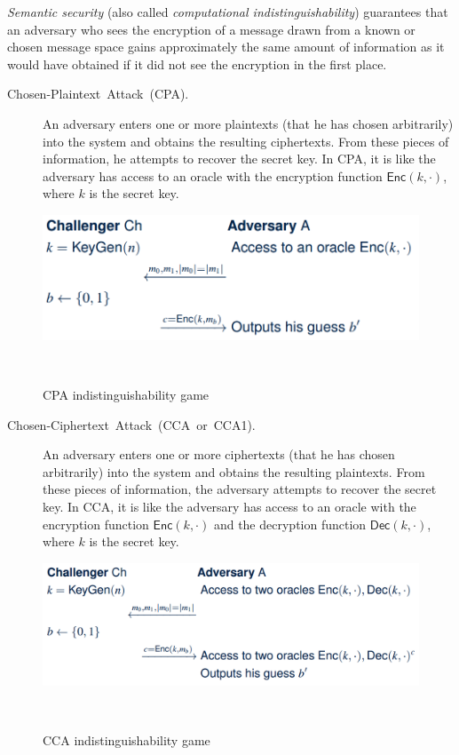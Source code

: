 \documentclass[10pt]{article}
\theoremstyle{plain}
\begin{document}
\emph{Semantic security} (also called \emph{computational indistinguishability})
guarantees that an adversary who sees the encryption of a message
\textendash{} drawn from a known or chosen message space \textendash{}
gains approximately the same amount of information as it would have
obtained if it did not see the encryption in the first place.
\begin{description}
	\item [{Chosen-Plaintext~Attack~(CPA).}] An adversary enters one or more
	plaintexts (that he has chosen arbitrarily) into the system and obtains
	the resulting ciphertexts. From these pieces of information, he attempts
	to recover the secret key. In CPA, it is like the adversary has access
	to an oracle with the encryption function $\mathsf{Enc}(k,\cdot)$,
	where $k$ is the secret key.
\end{description}
\begin{figure}
	\begin{description}
		\item [{\includegraphics[scale=0.55]{cpa-game}}]~
	\end{description}
	\caption{CPA indistinguishability game}
	\label{fig:cpa-game}
\end{figure}

\begin{description}
	\item [{Chosen-Ciphertext~Attack~(CCA~or~CCA1).}] An adversary enters
	one or more ciphertexts (that he has chosen arbitrarily) into the
	system and obtains the resulting plaintexts. From these pieces of
	information, the adversary attempts to recover the secret key. In
	CCA, it is like the adversary has access to an oracle with the encryption
	function $\mathsf{Enc}(k,\cdot)$ and the decryption function $\mathsf{Dec}(k,\cdot)$,
	where $k$ is the secret key.
\end{description}
\begin{figure}
	\begin{description}
		\item [{\includegraphics[scale=0.55]{cca-game}}]~
	\end{description}
	\caption{CCA indistinguishability game}
	\label{fig:cca-game}
\end{figure}
\end{document}
